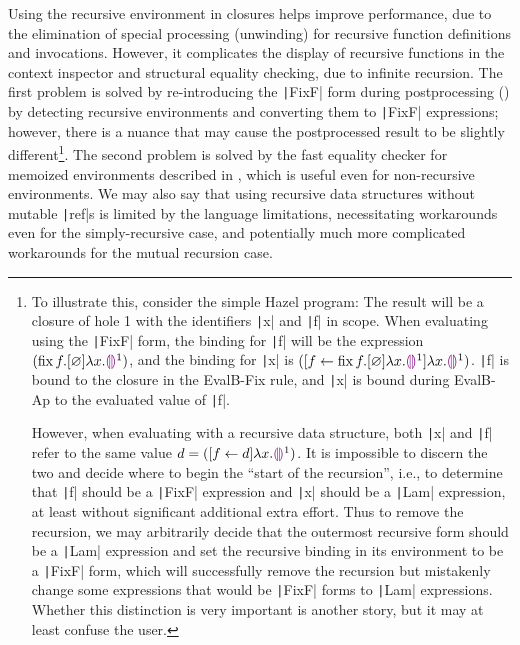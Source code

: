 Using the recursive environment in closures helps improve performance, due to the elimination of special processing (unwinding) for recursive function definitions and invocations. However, it complicates the display of recursive functions in the context inspector and structural equality checking, due to infinite recursion. The first problem is solved by re-introducing the \texttt|FixF| form during postprocessing () by detecting recursive environments and converting them to \texttt|FixF| expressions; however, there is a nuance that may cause the postprocessed result to be slightly different\footnote{
  To illustrate this, consider the simple Hazel program:
  The result will be a closure of hole 1 with the identifiers \texttt|x| and \texttt|f| in scope. When evaluating using the \texttt|FixF| form, the binding for \texttt|f| will be the expression $(\operatorname{fix} f.[\varnothing]\lambda x.\textcolor{violet}{\llparenthesis}\textcolor{violet}{\rrparenthesis}^1)$, and the binding for \texttt|x| is $([f\leftarrow \operatorname{fix} f.[\varnothing]\lambda x.\textcolor{violet}{\llparenthesis}\textcolor{violet}{\rrparenthesis}^1]\lambda x.\textcolor{violet}{\llparenthesis}\textcolor{violet}{\rrparenthesis}^1)$. \texttt|f| is bound to the closure in the EvalB-Fix rule, and \texttt|x| is bound during EvalB-Ap to the evaluated value of \texttt|f|.

  However, when evaluating with a recursive data structure, both \texttt|x| and \texttt|f| refer to the same value $d=([f\leftarrow d]\lambda x.\textcolor{violet}{\llparenthesis}\textcolor{violet}{\rrparenthesis}^1)$. It is impossible to discern the two and decide where to begin the ``start of the recursion'', i.e., to determine that \texttt|f| should be a \texttt|FixF| expression and \texttt|x| should be a \texttt|Lam| expression, at least without significant additional extra effort. Thus to remove the recursion, we may arbitrarily decide that the outermost recursive form should be a \texttt|Lam| expression and set the recursive binding in its environment to be a \texttt|FixF| form, which will successfully remove the recursion but mistakenly change some expressions that would be \texttt|FixF| forms to \texttt|Lam| expressions. Whether this distinction is very important is another story, but it may at least confuse the user.
}. The second problem is solved by the fast equality checker for memoized environments described in , which is useful even for non-recursive environments. We may also say that using recursive data structures without mutable \texttt|ref|s is limited by the language limitations, necessitating workarounds even for the simply-recursive case, and potentially much more complicated workarounds for the mutual recursion case.

